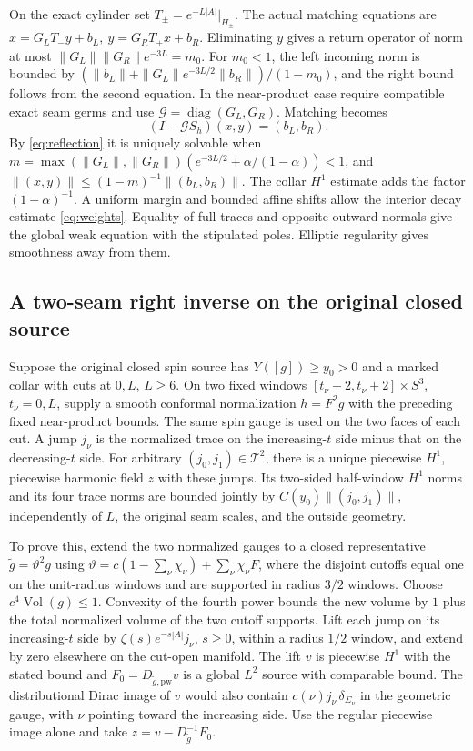 \documentclass[11pt]{article}
\theoremstyle{remark}
\newcommand{\Vol}{\operatorname{Vol}}
\begin{document}
On the exact cylinder set \(T_\pm=e^{-L|A|}|_{H_\pm}\). The actual matching equations are
\(x=G_LT_-y+b_L,\ y=G_RT_+x+b_R\).
Eliminating \(y\) gives a return operator of norm at most
\(\|G_L\|\|G_R\|e^{-3L}=m_0\). For \(m_0<1\), the left incoming norm is bounded by \((\|b_L\|+\|G_L\|e^{-3L/2}\|b_R\|)/(1-m_0)\), and the right bound follows from the second equation. In the near-product case require compatible exact seam germs and use \(\mathcal G=\operatorname{diag}(G_L,G_R)\). Matching becomes
\[
 (I-\mathcal G S_h)(x,y)=(b_L,b_R).
\]
By \eqref{eq:reflection} it is uniquely solvable when
\(m=\max(\|G_L\|,\|G_R\|)(e^{-3L/2}+\alpha/(1-\alpha))<1\), and
\(\|(x,y)\|\le (1-m)^{-1}\|(b_L,b_R)\|\).
The collar \(H^1\) estimate adds the factor \((1-\alpha)^{-1}\). A uniform margin and bounded affine shifts allow the interior decay estimate \eqref{eq:weights}. Equality of full traces and opposite outward normals give the global weak equation with the stipulated poles. Elliptic regularity gives smoothness away from them.

\subsection{A two-seam right inverse on the original closed source}
Suppose the original closed spin source has \(Y([g])\ge y_0>0\) and a marked collar with cuts at \(0,L\), \(L\ge6\). On two fixed windows \([t_\nu-2,t_\nu+2]\times S^3\), \(t_\nu=0,L\), supply a smooth conformal normalization \(h=F^2g\) with the preceding fixed near-product bounds. The same spin gauge is used on the two faces of each cut. A jump \(j_\nu\) is the normalized trace on the increasing-\(t\) side minus that on the decreasing-\(t\) side. For arbitrary \((j_0,j_1)\in\mathcal T^2\), there is a unique piecewise \(H^1\), piecewise harmonic field \(z\) with these jumps. Its two-sided half-window \(H^1\) norms and its four trace norms are bounded jointly by \(C(y_0)\|(j_0,j_1)\|\), independently of \(L\), the original seam scales, and the outside geometry.

To prove this, extend the two normalized gauges to a closed representative \(\widetilde g=\vartheta^2g\) using
\(\vartheta=c(1-\sum_\nu\chi_\nu)+\sum_\nu\chi_\nu F\), where the disjoint cutoffs equal one on the unit-radius windows and are supported in radius \(3/2\) windows. Choose \(c^4\Vol(g)\le1\). Convexity of the fourth power bounds the new volume by \(1\) plus the total normalized volume of the two cutoff supports. Lift each jump on its increasing-\(t\) side by \(\zeta(s)e^{-s|A|}j_\nu\), \(s\ge0\), within a radius \(1/2\) window, and extend by zero elsewhere on the cut-open manifold. The lift \(v\) is piecewise \(H^1\) with the stated bound and \(F_0=D_{\widetilde g,\mathrm{pw}}v\) is a global \(L^2\) source with comparable bound. The distributional Dirac image of \(v\) would also contain \(c(\nu)j_\nu\,\delta_{\Sigma_\nu}\) in the geometric gauge, with \(\nu\) pointing toward the increasing side. Use the regular piecewise image alone and take \(z=v-D_{\widetilde g}^{-1}F_0\).
\end{document}
